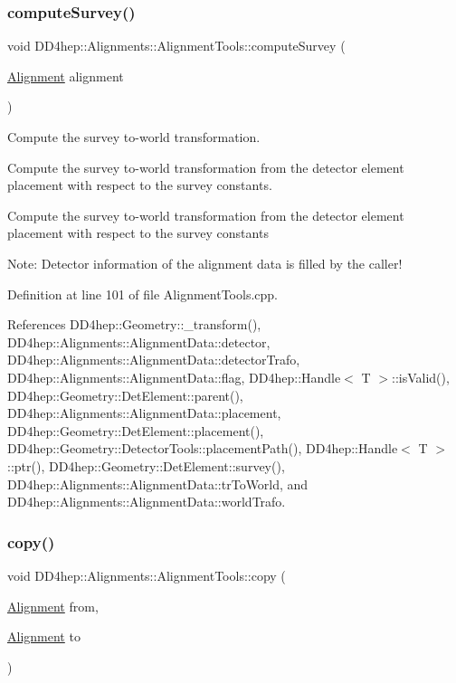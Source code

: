 \subsubsection{\texorpdfstring{compute\+Survey()}{computeSurvey()}}
{\footnotesize\ttfamily void D\+D4hep\+::\+Alignments\+::\+Alignment\+Tools\+::compute\+Survey (\begin{DoxyParamCaption}\item[{\hyperlink{class_d_d4hep_1_1_alignments_1_1_alignment}{Alignment}}]{alignment }\end{DoxyParamCaption})}



Compute the survey to-\/world transformation. 

Compute the survey to-\/world transformation from the detector element placement with respect to the survey constants.

Compute the survey to-\/world transformation from the detector element placement with respect to the survey constants

Note\+: Detector information of the alignment data is filled by the caller! 

Definition at line 101 of file Alignment\+Tools.\+cpp.



References D\+D4hep\+::\+Geometry\+::\+\_\+transform(), D\+D4hep\+::\+Alignments\+::\+Alignment\+Data\+::detector, D\+D4hep\+::\+Alignments\+::\+Alignment\+Data\+::detector\+Trafo, D\+D4hep\+::\+Alignments\+::\+Alignment\+Data\+::flag, D\+D4hep\+::\+Handle$<$ T $>$\+::is\+Valid(), D\+D4hep\+::\+Geometry\+::\+Det\+Element\+::parent(), D\+D4hep\+::\+Alignments\+::\+Alignment\+Data\+::placement, D\+D4hep\+::\+Geometry\+::\+Det\+Element\+::placement(), D\+D4hep\+::\+Geometry\+::\+Detector\+Tools\+::placement\+Path(), D\+D4hep\+::\+Handle$<$ T $>$\+::ptr(), D\+D4hep\+::\+Geometry\+::\+Det\+Element\+::survey(), D\+D4hep\+::\+Alignments\+::\+Alignment\+Data\+::tr\+To\+World, and D\+D4hep\+::\+Alignments\+::\+Alignment\+Data\+::world\+Trafo.

\hypertarget{namespace_d_d4hep_1_1_alignments_1_1_alignment_tools_a03e005e692b6427d78828d1785791a50}{}\label{namespace_d_d4hep_1_1_alignments_1_1_alignment_tools_a03e005e692b6427d78828d1785791a50} 
\subsubsection{\texorpdfstring{copy()}{copy()}}
{\footnotesize\ttfamily void D\+D4hep\+::\+Alignments\+::\+Alignment\+Tools\+::copy (\begin{DoxyParamCaption}\item[{\hyperlink{class_d_d4hep_1_1_alignments_1_1_alignment}{Alignment}}]{from,  }\item[{\hyperlink{class_d_d4hep_1_1_alignments_1_1_alignment}{Alignment}}]{to }\end{DoxyParamCaption})}



